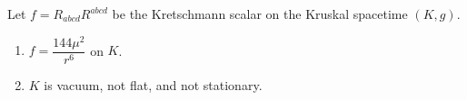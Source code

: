 Let $f = R_{abcd}R^{abcd}$ be the Kretschmann scalar on the Kruskal spacetime $(K, g)$.

\begin{enumerate}
\item[(a)] $f = \dfrac{144\mu^2}{r^6}$ on $K$.
\item[(b)] $K$ is vacuum, not flat, and not stationary.
\end{enumerate}
